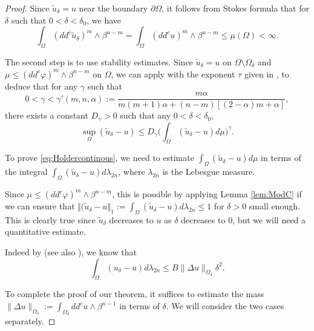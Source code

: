 \begin{proof}
Since $\tilde u_\delta = u$ near the boundary $\partial \Omega$, it follows from Stokes formula that for $\delta$ such that $0 < \delta < \delta_0$, we have
\[
\int_{\Omega}(dd^c\tilde{u}_{\delta})^m\wedge\beta^{n-m} = \int_{\Omega}(dd^c u)^m\wedge\beta^{n-m} \leq \mu (\Omega) < \infty.
\]

The second step is to use stability estimates. Since $\tilde u_\delta = u$ on $\Omega \setminus \Omega_\delta$ and $\mu\leq (dd^c\varphi)^m\wedge\beta^{n-m}$ on $\Omega$, we can apply \cite[Prop.\,2.20]{BZ20} with the exponent $\tau$ given in \cite[Th.\,A]{BZ20}, to deduce that for any $\gamma$ such that
\[
0 <\gamma < \gamma' (m,n,\alpha):=
\frac{m \alpha}{ m (m + 1) \alpha + (n-m) [(2 - \alpha)m + \alpha]},
\]
there exists a constant $D_\gamma > 0$ such that any $0 < \delta < \delta_0$,
\begin{equation} \label{eq2}
\sup_{\Omega}(\tilde{u}_{\delta}-u) \leq D_{\gamma} \biggl(\int_{\Omega}(\tilde{u}_{\delta}-u) d\mu\biggr)^{\gamma}.
\end{equation}

To prove \eqref{eq:Holdercontinous}, we need to estimate $\int_{\Omega}(\tilde{u}_{\delta}-u) d\mu$ in terms of the integral \hbox{$\int_{\Omega}(\tilde{u}_{\delta}-u) d\lambda_{2n}$}, where $\lambda_{2n}$ is the Lebesgue measure.

Since $\mu \leq (dd^c \varphi)^m \wedge \beta^{n-m}$, this is possible by applying Lemma \ref{lem:ModC} if we can ensure that $\Vert (\tilde{u}_{\delta}-u \Vert_{1} := \int_{\Omega}(\tilde{u}_{\delta}-u) d\lambda_{2n} \leq 1$ for $\delta > 0$ small enough. This is clearly true since $\tilde{u}_\delta$ decreases to $ u$ as $\delta$ decreases to $0$, but we will need a quantitative estimate.

Indeed by \cite{GKZ08} (see also \cite[Lem.\,2.3]{BZ20}), we know that
\begin{equation} \label{eq3}
\int_{\Omega}({u}_{\delta}-u) d \lambda_{2 n} \leq B \|\Delta u\|_{\Omega_\delta}\delta^2.
\end{equation}

To complete the proof of our theorem, it suffices to estimate the mass $\|\Delta u\|_{\Omega_\delta} := \int_{\Omega_\delta} dd^c u \wedge \beta^{n-1}$ in terms of $\delta$.
We will consider the two cases separately.


\end{proof}
